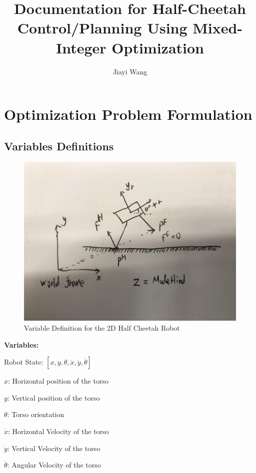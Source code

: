 \documentclass[a4paper,10pt]{article}
\title{Documentation for Half-Cheetah Control/Planning Using Mixed-Integer Optimization}
\author{Jiayi Wang}
\begin{document}
\maketitle

\section{Optimization Problem Formulation}

\subsection{Variables Definitions}

\begin{figure}[h!]
	\centering
	\includegraphics[scale = 0.3]{variable_definitions}
	\caption{Variable Definition for the 2D Half Cheetah Robot}
	\label{fig:variable_definitions}
\end{figure}

\textbf{Variables:}
\vspace{2mm}

Robot State: $ [x, y, \theta, \dot{x} ,\dot{y}, \dot{\theta}]$

$x$: Horizontal position of the torso

$y$: Vertical position of the torso

$\theta$: Torso orientation

$\dot{x}$: Horizontal Velocity of the torso

$\dot{y}$: Vertical Velocity of the torso

$\dot{\theta}$: Angular Velocity of the torso
\end{document}
